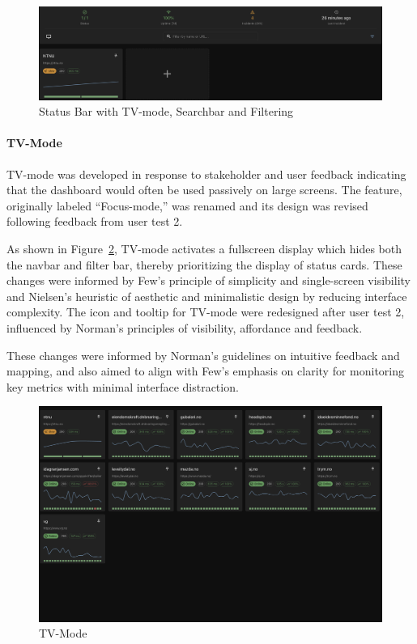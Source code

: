 {\begin{figure}[H]
    \centering
    \includegraphics[width=1\linewidth]{figures/statusbar.png}
    \caption{Status Bar with TV-mode, Searchbar and Filtering}
    \label{fig:statusbar}
\end{figure}

\paragraph{TV-Mode}
TV-mode was developed in response to stakeholder and user feedback indicating that the dashboard would often be used passively on large screens. The feature, originally labeled “Focus-mode,” was renamed and its design was revised following feedback from user test 2.

As shown in Figure~\ref{fig:tv-mode}, TV-mode activates a fullscreen display which hides both the navbar and filter bar, thereby prioritizing the display of status cards.  These changes were informed by Few's principle of simplicity and single-screen visibility and Nielsen's heuristic of aesthetic and minimalistic design by reducing interface complexity. The icon and tooltip for TV-mode were redesigned after user test 2, influenced by Norman's principles of visibility, affordance and feedback. 

These changes were informed by Norman’s guidelines on intuitive feedback and mapping, and also aimed to align with Few’s emphasis on clarity for monitoring key metrics with minimal interface distraction.

\begin{figure}[H]
    \centering
    \includegraphics[width=0.75\linewidth]{figures/tv-mode.png}
    \caption{TV-Mode}
    \label{fig:tv-mode}
\end{figure}


}
